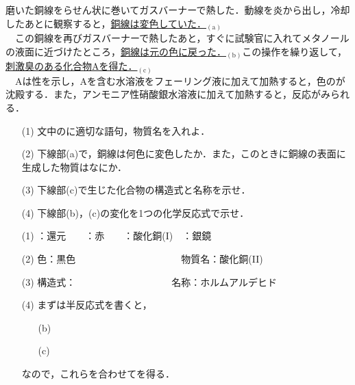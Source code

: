 \documentclass[a4paper,12pt]{ltjsreport}
\begin{document}
\begin{que}
磨いた銅線をらせん状に巻いてガスバーナーで熱した．動線を炎から出し，冷却したあとに観察すると，\underline{銅線は変色していた．}$_{(\mathrm{a})}$\\
　この銅線を再びガスバーナーで熱したあと，すぐに試験官に入れてメタノールの液面に近づけたところ，\underline{銅線は元の色に戻った．}$_{(\mathrm{b})}$この操作を繰り返して，\underline{刺激臭のある化合物Aを得た．}$_{(\mathrm{c})}$\\
　Aは性を示し，Aを含む水溶液をフェーリング液に加えて加熱すると，色のが沈殿する．また，アンモニア性硝酸銀水溶液に加えて加熱すると，反応がみられる．
\begin{itemize}
    \item [(1)]文中の\fbox{　}に適切な語句，物質名を入れよ．
    \item [(2)]下線部(a)で，銅線は何色に変色したか．また，このときに銅線の表面に生成した物質はなにか．
    \item [(3)]下線部(c)で生じた化合物の構造式と名称を示せ．
    \item [(4)]下線部(b)，(c)の変化を1つの化学反応式で示せ．
\end{itemize}
\end{que}
\ans 
\begin{itemize}
    \item[(1)]：還元　　：赤　　：酸化銅(I)　：銀鏡\\[20pt]
    \item [(2)]色：黒色　　　　　　　　　　　物質名：酸化銅(II)\\
    \item [(3)]構造式：　　　　　　　　　　名称：ホルムアルデヒド\\[10pt]
    \item [(4)]まずは半反応式を書くと，\begin{itemize}
        \item [(b)]
    \item[(c)]
    \end{itemize}
   なので，これらを合わせてを得る．
\end{itemize}
\end{document}
